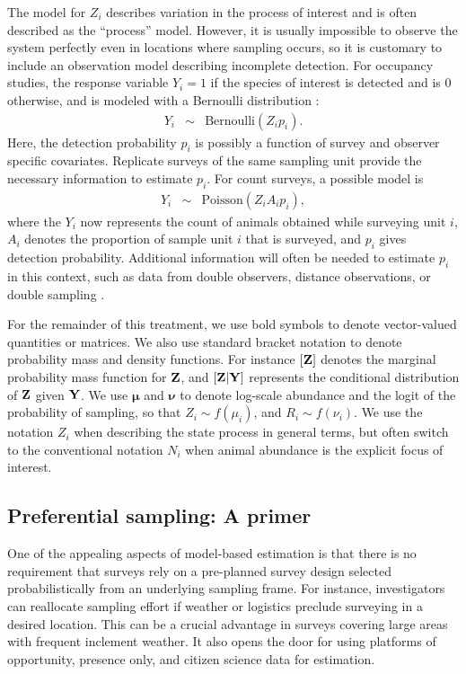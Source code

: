 \documentclass[times,mee,doublespace,]{besauth2}
\begin{document}
The model for $Z_i$ describes variation in the process of interest and is often described as the ``process'' model.  However, it is usually impossible to observe the system perfectly even in locations where sampling occurs, so it is customary to include an observation model describing incomplete detection.  For occupancy studies, the response variable $Y_i = 1$ if the species of interest is detected and is 0 otherwise, and is modeled with a Bernoulli distribution \citep{Royle2008}:
\begin{eqnarray}
  Y_i & \sim & \text{Bernoulli}(Z_i p_i).
\end{eqnarray}
 Here, the detection probability $p_i$ is possibly a function of survey and observer specific covariates. Replicate surveys of the same sampling unit provide the necessary information to estimate $p_i$.   For count surveys, a possible model is
\begin{eqnarray}
  \label{eq:obs_pois}
  Y_i & \sim & \text{Poisson}(Z_i A_i p_i),
\end{eqnarray}
where the $Y_i$ now represents the count of animals obtained while surveying unit $i$, $A_i$ denotes the proportion of sample unit $i$ that is surveyed, and $p_i$ gives detection probability.  Additional information will often be needed to estimate $p_i$ in this context, such as data from double observers, distance observations, or double sampling \citep[see e.g.][]{BucklandEtAl2001,Royle2004,Borchers2006,ConnEtAl2014}.

For the remainder of this treatment, we use bold symbols to denote vector-valued quantities or matrices.  We also use standard bracket notation to denote probability mass and density functions.  For instance $[{\bf Z}]$ denotes the marginal probability mass function for ${\bf Z}$, and  $[{\bf Z}|{\bf Y}]$ represents the conditional distribution of ${\bf Z}$ given ${\bf Y}$.  We use $\boldsymbol{\mu}$ and $\boldsymbol{\nu}$ to denote log-scale abundance and the logit of the probability of sampling, so that $Z_i \sim f(\mu_i)$, and $R_i \sim f(\nu_i)$.  We use the notation $Z_i$ when describing the state process in general terms, but often switch to the conventional notation $N_i$ when animal abundance is the explicit focus of interest.

\subsection{Preferential sampling: A primer}

One of the appealing aspects of model-based estimation is that there is no requirement that surveys rely on a pre-planned survey design selected probabilistically from an underlying sampling frame.  For instance, investigators can reallocate sampling effort if weather or logistics preclude surveying in a desired location.  This can be a crucial advantage in surveys covering large areas with frequent inclement weather.  It also opens the door for using platforms of opportunity, presence only, and citizen science data for estimation.
\end{document}
